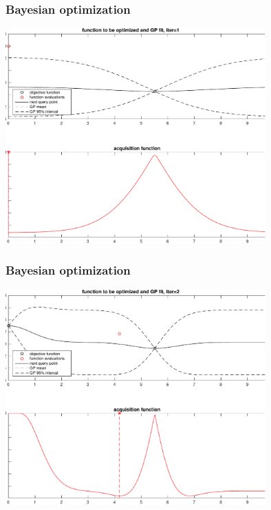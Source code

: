 \documentclass[10pt,handout]{beamer}
\begin{document}
\begin{frame}

\frametitle{Bayesian optimization}

    \includegraphics[width=10cm]{figs/bayesopt_1d_regular_iter1-crop.pdf}

\end{frame}

\begin{frame}

\frametitle{Bayesian optimization}

    \includegraphics[width=10cm]{figs/bayesopt_1d_regular_iter2-crop.pdf}

\end{frame}
\end{document}
